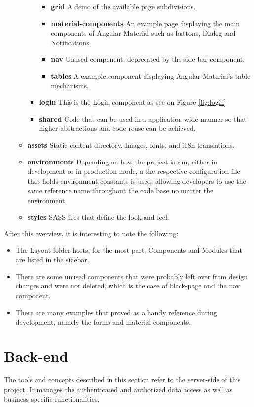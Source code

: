 \begin{itemize}
\begin{itemize}
\begin{itemize}
\begin{itemize}
      \item \textbf{grid} A demo of the available page subdivisions.
      \item \textbf{material-components} An example page displaying the main components of Angular Material such as buttons, Dialog and Notifications.
      \item \textbf{nav} Unused component, deprecated by the side bar component.
      \item \textbf{tables} A example component displaying Angular Material's table mechanisms.
      \end{itemize}

    \item \textbf{login} This is the Login component as see on Figure \ref{fig:login}
    \item \textbf{shared} Code that can be used in a application wide manner so that higher abstractions and code reuse can be achieved.
    \end{itemize}
  \item \textbf{assets} Static content directory. Images, fonts, and i18n translations.
  \item \textbf{environments} Depending on how the project is run, either in development or in production mode, a the respective configuration file that holds environment constants is used, allowing developers to use the same reference name throughout the code base no matter the environment.
  \item \textbf{styles} \gls{SASS} files that define the look and feel.
  \end{itemize}
\end{itemize}

After this overview, it is interesting to note the following:
\begin{itemize}
\item The Layout folder hosts, for the most part, Components and Modules that are listed in the sidebar.\item There are some unused components that were probably left over from design changes and were not deleted, which is the case of black-page and the nav component.
\item There are many examples that proved as a handy reference during development, namely the forms and material-components.
\end{itemize}

\section{Back-end}\label{cha:concepts:sec:backend}
The tools and concepts described in this section refer to the server-side of this project. It manages the authenticated and authorized data access as well as business-specific functionalities.

